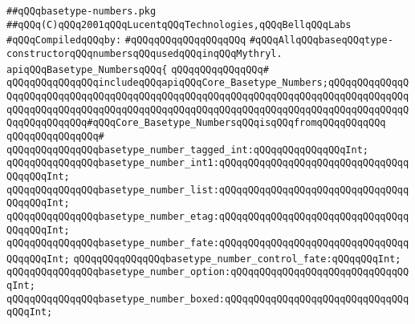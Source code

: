 \label{src/lib/compiler/front/typer/basics/basetype-numbers.pkg}
\verb|##qQQqbasetype-numbers.pkg|\newline
\verb|##qQQq(C)qQQq2001qQQqLucentqQQqTechnologies,qQQqBellqQQqLabs|\newline
\newline
\verb|#qQQqCompiledqQQqby:|\newline
\verb|#qQQqqQQqqQQqqQQqqQQq|\newline
\newline
\verb|#qQQqAllqQQqbaseqQQqtype-constructorqQQqnumbersqQQqusedqQQqinqQQqMythryl.|\newline
\newline
\newline
\newline
\verb|apiqQQqBasetype_NumbersqQQq{|\newline
\verb|qQQqqQQqqQQqqQQq#|\newline
\verb|qQQqqQQqqQQqqQQqincludeqQQqapiqQQqCore_Basetype_Numbers;qQQqqQQqqQQqqQQqqQQqqQQqqQQqqQQqqQQqqQQqqQQqqQQqqQQqqQQqqQQqqQQqqQQqqQQqqQQqqQQqqQQqqQQqqQQqqQQqqQQqqQQqqQQqqQQqqQQqqQQqqQQqqQQqqQQqqQQqqQQqqQQqqQQqqQQqqQQqqQQqqQQqqQQq#qQQqCore_Basetype_NumbersqQQqisqQQqfromqQQqqQQqqQQq|\newline
\verb|qQQqqQQqqQQqqQQq#|\newline
\verb|qQQqqQQqqQQqqQQqbasetype_number_tagged_int:qQQqqQQqqQQqqQQqInt;|\newline
\verb|qQQqqQQqqQQqqQQqbasetype_number_int1:qQQqqQQqqQQqqQQqqQQqqQQqqQQqqQQqqQQqqQQqInt;|\newline
\verb|qQQqqQQqqQQqqQQqbasetype_number_list:qQQqqQQqqQQqqQQqqQQqqQQqqQQqqQQqqQQqqQQqInt;|\newline
\verb|qQQqqQQqqQQqqQQqbasetype_number_etag:qQQqqQQqqQQqqQQqqQQqqQQqqQQqqQQqqQQqqQQqInt;|\newline
\verb|qQQqqQQqqQQqqQQqbasetype_number_fate:qQQqqQQqqQQqqQQqqQQqqQQqqQQqqQQqqQQqqQQqInt;|\newline
\verb|qQQqqQQqqQQqqQQqbasetype_number_control_fate:qQQqqQQqInt;|\newline
\verb|qQQqqQQqqQQqqQQqbasetype_number_option:qQQqqQQqqQQqqQQqqQQqqQQqqQQqqQQqInt;|\newline
\verb|qQQqqQQqqQQqqQQqbasetype_number_boxed:qQQqqQQqqQQqqQQqqQQqqQQqqQQqqQQqqQQqInt;|\newline

